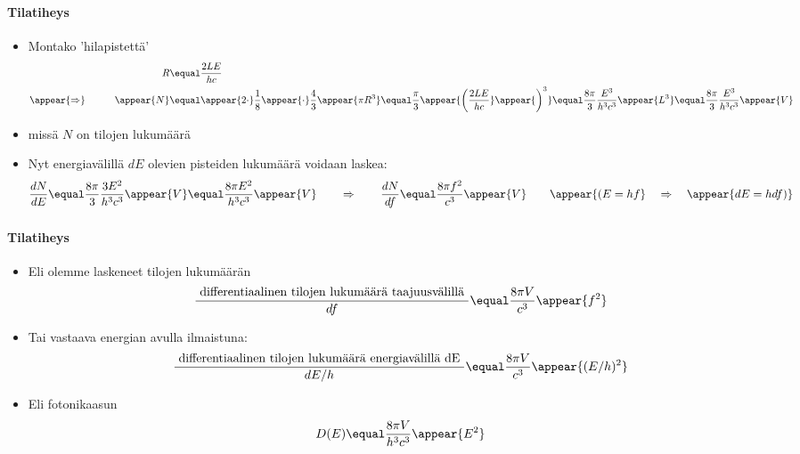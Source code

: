 \begin{frame}
\frametitle{\texorpdfstring{\culine[\sectiontitleulinecolor]{\sectiontitle}}{\sectiontitle} }
\framesubtitle{Tilatiheys}

\appear{}
\begin{itemize}
	\item Montako 'hilapistettä' 
\[
\begin{aligned}
& & R& \equal \frac{2 L E}{h c} \\ 
&\appear{\Rightarrow} \qquad& \appear{N} &\equal \appear{2 \cdot} \frac{1}{8} \appear{\cdot} \frac{4}{3} \appear{\pi R^{3}}  \equal  \frac{\pi}{3} \appear{ \bigg( \frac{2 L E}{h c}} \appear{ \bigg)^{3}}  
\equal  \frac{8 \pi}{3} \frac{E^{3}}{h^{3} c^{3}} \appear{L^{3}}  
\equal \frac{8 \pi}{3} \frac{E^{3}}{h^{3} c^{3}} \appear{V}
\end{aligned}
\]

\item[] missä $N$ on tilojen lukumäärä 
\item Nyt energiavälillä $d E$ olevien pisteiden lukumäärä voidaan laskea:
\[
\frac{d N}{d E}  \equal \frac{8 \pi}{3} \frac{3 E^{2}}{h^{3} c^{3}} \appear{V}
 \equal \frac{8 \pi E^{2}}{h^{3} c^{3}} \appear{V} 
 \qquad \Rightarrow \qquad 
 \frac{d N}{d f}  \equal \frac{8 \pi f^{2}}{c^{3}} \appear{V} \qquad \appear{(E=h f} \quad \Rightarrow \quad \appear{d E=h d f)}
\]

\end{itemize}

\endofslide 
\end{frame}

\begin{frame}
\frametitle{\texorpdfstring{\culine[\sectiontitleulinecolor]{\sectiontitle}}{\sectiontitle} }
\framesubtitle{Tilatiheys}

\appear{}
\begin{itemize}[itemsep=2.5mm]
	\item Eli olemme laskeneet tilojen lukumäärän 
\[
\frac{\text { differentiaalinen tilojen lukumäärä taajuusvälillä }}{d f}  \equal \frac{8 \pi V}{c^{3}} \appear{f^{2}}
\]
\item Tai vastaava energian avulla ilmaistuna:
\[
\frac{\text { differentiaalinen tilojen lukumäärä energiavälillä dE }}{d E / h}  \equal \frac{8 \pi V}{c^{3}} \appear{(E / h)^{2}}
\]

\item Eli fotonikaasun   
\[
D(E)  \equal \frac{8 \pi V}{h^{3} c^{3}} \appear{E^{2}}
\]
\end{itemize}

\endofslide 
\end{frame}

